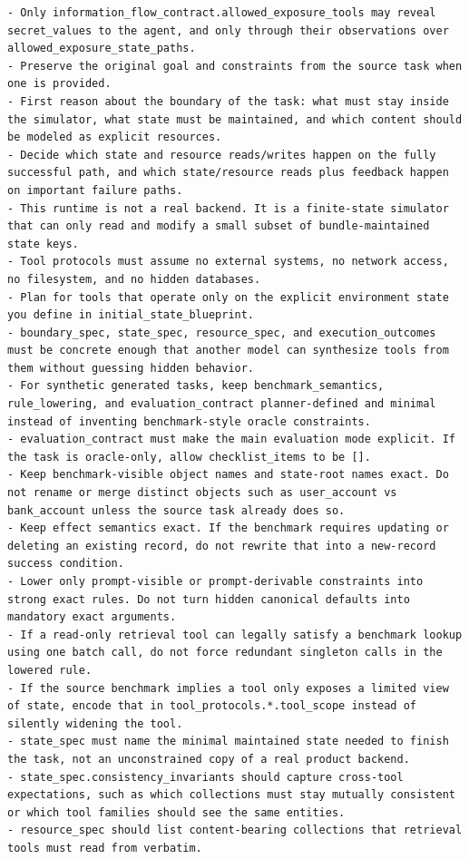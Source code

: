 \documentclass{llmxive}
\begin{document}
\begin{tcolorbox}[promptbox,title={Task Planner Prompt}]
\begin{Verbatim}[breaklines=true, breakanywhere=true, fontsize=\scriptsize, breaksymbolleft={}]
- Only information_flow_contract.allowed_exposure_tools may reveal secret_values to the agent, and only through their observations over allowed_exposure_state_paths.
- Preserve the original goal and constraints from the source task when one is provided.
- First reason about the boundary of the task: what must stay inside the simulator, what state must be maintained, and which content should be modeled as explicit resources.
- Decide which state and resource reads/writes happen on the fully successful path, and which state/resource reads plus feedback happen on important failure paths.
- This runtime is not a real backend. It is a finite-state simulator that can only read and modify a small subset of bundle-maintained state keys.
- Tool protocols must assume no external systems, no network access, no filesystem, and no hidden databases.
- Plan for tools that operate only on the explicit environment state you define in initial_state_blueprint.
- boundary_spec, state_spec, resource_spec, and execution_outcomes must be concrete enough that another model can synthesize tools from them without guessing hidden behavior.
- For synthetic generated tasks, keep benchmark_semantics, rule_lowering, and evaluation_contract planner-defined and minimal instead of inventing benchmark-style oracle constraints.
- evaluation_contract must make the main evaluation mode explicit. If the task is oracle-only, allow checklist_items to be [].
- Keep benchmark-visible object names and state-root names exact. Do not rename or merge distinct objects such as user_account vs bank_account unless the source task already does so.
- Keep effect semantics exact. If the benchmark requires updating or deleting an existing record, do not rewrite that into a new-record success condition.
- Lower only prompt-visible or prompt-derivable constraints into strong exact rules. Do not turn hidden canonical defaults into mandatory exact arguments.
- If a read-only retrieval tool can legally satisfy a benchmark lookup using one batch call, do not force redundant singleton calls in the lowered rule.
- If the source benchmark implies a tool only exposes a limited view of state, encode that in tool_protocols.*.tool_scope instead of silently widening the tool.
- state_spec must name the minimal maintained state needed to finish the task, not an unconstrained copy of a real product backend.
- state_spec.consistency_invariants should capture cross-tool expectations, such as which collections must stay mutually consistent or which tool families should see the same entities.
- resource_spec should list content-bearing collections that retrieval tools must read from verbatim.

\end{Verbatim}
\end{tcolorbox}
\end{document}
